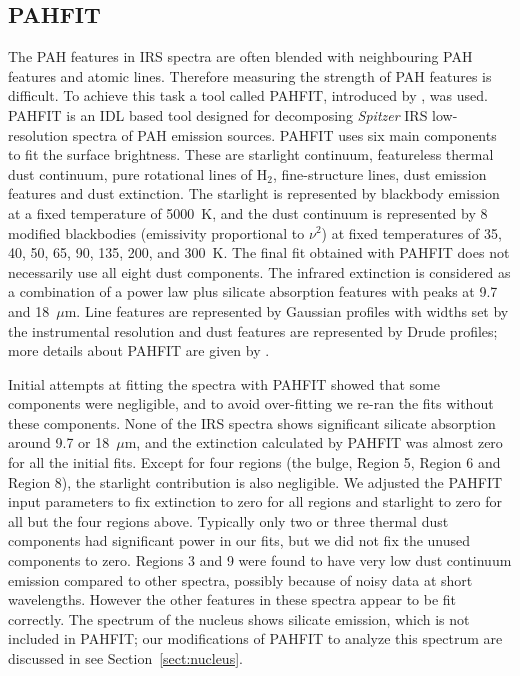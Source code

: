 \subsection{PAHFIT}
\label{sect:pahfit}
The PAH features in  IRS spectra are often blended with neighbouring PAH features and atomic lines. 
Therefore measuring the strength of PAH features is difficult.  To achieve this task a tool called PAHFIT, introduced by \citet{Smith:2007lr}, was used. 
PAHFIT is an IDL  based tool designed for decomposing {\em Spitzer} IRS low-resolution spectra of PAH emission sources.
PAHFIT uses six main components to fit the surface brightness. These are starlight continuum, featureless thermal dust continuum, 
pure rotational lines of H$_2$, fine-structure lines, dust emission features and dust extinction. The starlight is represented by  blackbody 
emission at a fixed temperature of 5000~K, and the dust continuum is represented by 8 modified blackbodies (emissivity proportional to $\nu^2$)  
at fixed temperatures of 35, 40, 50, 65, 90, 135, 200, and 300~K. The final fit obtained with PAHFIT does not necessarily use
all eight dust components.
The infrared extinction is considered as a combination of a power law plus silicate absorption features with peaks at 9.7 and 18~$\mu$m. 
Line features are represented by Gaussian profiles with widths set by the instrumental resolution
and dust features are represented by Drude profiles; more details about PAHFIT are given by \citet{Smith:2007lr}.


Initial attempts at fitting the spectra with PAHFIT showed that some components were negligible, and
to avoid over-fitting we re-ran the fits without these components.
None of the IRS spectra shows significant silicate absorption around 9.7 or 18~$\mu$m, and the extinction calculated by PAHFIT 
was almost zero for all the initial fits. Except for four regions (the bulge, Region 5, Region 6 and Region 8),
the starlight contribution is also negligible.
We adjusted the PAHFIT input parameters to fix extinction to zero for all regions and starlight to zero for all but the four regions above.
Typically only two or three thermal dust components had significant power in our fits, but we did not fix the unused components to zero.
Regions 3 and 9 were found to have very low dust continuum emission compared to other spectra,
possibly because of noisy data at short wavelengths. However the other features in these spectra appear to
be fit correctly. The spectrum of the nucleus shows silicate emission, which is not included in PAHFIT;  
our modifications of PAHFIT to analyze this spectrum are discussed in see Section~\ref{sect:nucleus}.

